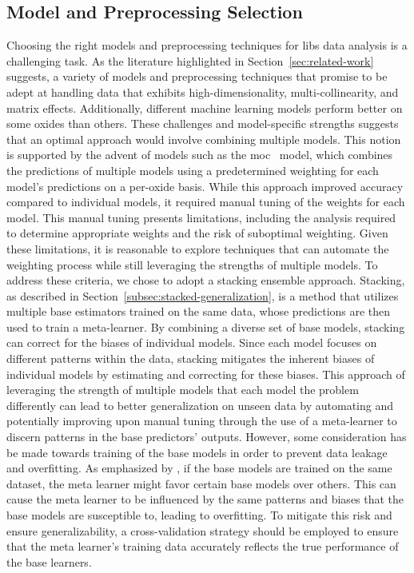 \subsection{Model and Preprocessing Selection}
Choosing the right models and preprocessing techniques for \gls{libs} data analysis is a challenging task. 
As the literature highlighted in Section~\ref{sec:related-work} suggests, a variety of models and preprocessing techniques that promise to be adept at handling data that exhibits high-dimensionality, multi-collinearity, and matrix effects.
Additionally, different machine learning models perform better on some oxides than others. 
These challenges and model-specific strengths suggests that an optimal approach would involve combining multiple models. 
This notion is supported by the advent of models such as the \gls{moc}~\cite{cleggRecalibrationMarsScience2017} model, which combines the predictions of multiple models using a predetermined weighting for each model's predictions on a per-oxide basis.
While this approach improved accuracy compared to individual models, it required manual tuning of the weights for each model.
This manual tuning presents limitations, including the analysis required to determine appropriate weights and the risk of suboptimal weighting.
Given these limitations, it is reasonable to explore techniques that can automate the weighting process while still leveraging the strengths of multiple models.
To address these criteria, we chose to adopt a stacking ensemble approach. 
Stacking, as described in Section~\ref{subsec:stacked-generalization}, is a method that utilizes multiple base estimators trained on the same data, whose predictions are then used to train a meta-learner.
By combining a diverse set of base models, stacking can correct for the biases of individual models.
Since each model focuses on different patterns within the data, stacking mitigates the inherent biases of individual models by estimating and correcting for these biases.
This approach of leveraging the strength of multiple models that each model the problem differently can lead to better generalization on unseen data by automating and potentially improving upon manual tuning through the use of a meta-learner to discern patterns in the base predictors' outputs. \cite{wolpertstacked_1992} \cite{survey_of_ensemble_learning}
However, some consideration has be made towards training of the base models in order to prevent data leakage and overfitting.
As emphasized by \citet{cvstacking}, if the base models are trained on the same dataset, the meta learner might favor certain base models over others.
This can cause the meta learner to be influenced by the same patterns and biases that the base models are susceptible to, leading to overfitting.
To mitigate this risk and ensure generalizability, a cross-validation strategy should be employed to ensure that the meta learner's training data accurately reflects the true performance of the base learners.

